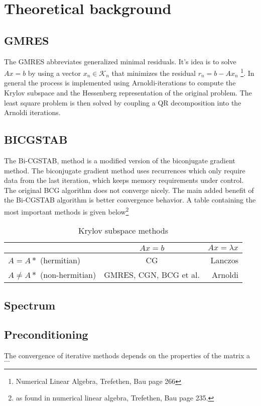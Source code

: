 \section{Theoretical background}
\subsection{GMRES}
The GMRES abbreviates generalized minimal residuals. It's idea is to solve $Ax = b$ by using a vector
$x_n \in \mathcal{K}_n$ that minimizes the residual $r_n = b - Ax_n$ \footnote{Numerical Linear Algebra, Trefethen, Bau page 266}.
In general the process is implemented using Arnoldi-iterations to compute the Krylov subspace and the Hessenberg representation of the
original problem. The least square problem is then solved by coupling a QR decomposition into the Arnoldi iterations. 

\subsection{BICGSTAB}
The Bi-CGSTAB, method is a modified version of the biconjugate gradient method. The biconjugate gradient method uses recurrences which only
require data from the last iteration, which keeps memory requirements under control. The original BCG algorithm does not converge 
nicely. The main added benefit of the Bi-CGSTAB algorithm is better convergence behavior. 
A table containing the most important methods is given below\footnote{ as found in numerical linear algebra, Trefethen, Bau page 235.}

\begin{table}
\centering
\begin{tabular}{|l|c|r|} \hline
   						    & $Ax = b$ & $Ax = \lambda x$ \\ \hline
$A = A*$ (hermitian)        & CG	   &  Lanczos		   \\ \hline
$A \neq A*$ (non-hermitian) & GMRES, CGN, BCG et al. & Arnoldi \\ \hline
\end{tabular}
\caption{Krylov subspace methods}
\label{tab:KrySub}
\end{table}



\subsection{Spectrum}


\subsection{Preconditioning}
The convergence of iterative methods depends on the properties of the matrix a $\dots$